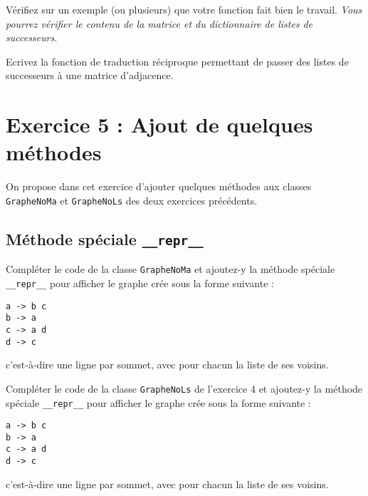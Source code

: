 \documentclass[12pt]{book}
\begin{document}

\Quest Vérifiez sur un exemple (ou plusieurs) que votre fonction fait bien le travail. \emph{Vous pourrez vérifier le contenu de la matrice et du dictionnaire de listes de successeurs}.

\Quest Ecrivez la fonction de traduction réciproque permettant de passer des listes de successeurs à une matrice d'adjacence.


\begin{sol}
\Quest {}
\Quest {}
\Quest 
\end{sol}

\section{Exercice 5 : Ajout de quelques méthodes}\label{exercice-6-ajout-de-quelques-muxe9thodes}

On propose dans cet exercice d'ajouter quelques méthodes aux classes \texttt{GrapheNoMa} et \texttt{GrapheNoLs} des deux exercices précédents.


\subsection{\texorpdfstring{Méthode spéciale \texttt{\_\_repr\_\_}}{Méthode spéciale \_\_repr\_\_}}\label{muxe9thode-spuxe9ciale-__repr__}

\Quest[1] Compléter le code de la classe \texttt{GrapheNoMa} et ajoutez-y la méthode spéciale \texttt{\_\_repr\_\_} pour afficher le graphe crée sous la forme suivante :

\begin{verbatim}
a -> b c
b -> a
c -> a d
d -> c
\end{verbatim}

c'est-à-dire une ligne par sommet, avec pour chacun la liste de ses
voisins.

\Quest Compléter le code de la classe \texttt{GrapheNoLs} de l'exercice 4 et ajoutez-y la méthode spéciale \texttt{\_\_repr\_\_} pour afficher le graphe crée sous la forme suivante :

\begin{verbatim}
a -> b c
b -> a
c -> a d
d -> c
\end{verbatim}

c'est-à-dire une ligne par sommet, avec pour chacun la liste de ses voisins.
\end{document}
